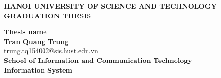 \documentclass[main.tex]{subfiles}
\begin{document}
\begin{titlepage}
\thispagestyle{empty}
\begin{center}

{\textbf{\large{HANOI UNIVERSITY OF SCIENCE AND TECHNOLOGY}}}\\[4cm]

{\textbf{\huge{GRADUATION THESIS}}}\\[1cm]
{\textbf{\Large{Thesis name}}\\[1cm]

{\textbf{\large{Tran Quang Trung}}}\\
{\large{trung.tq154002@sis.hust.edu.vn}}\\[0.5cm]

{\textbf{\large{School of Information and Communication Technology}}}\\
{\textbf{\large{Information System}}}\\

\vspace{5cm}
\begin{table}[H]
\centering
{}
\end{table}}
\end{center}



\end{titlepage}
\end{document}
